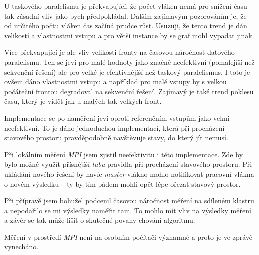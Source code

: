 \documentclass[czech]{article}
\begin{document}
U taskového paralelismu je překvapující, že počet vláken nemá pro snížení času tak zásadní vliv jako bych předpokládal.
Dalším zajímavým pozorováním je, že od určitého počtu vláken čas začíná prudce růst.
Usuzuji, že tento trend je dán velikostí a vlastnostmi vstupu a pro větší instance by se graf mohl vypadat jinak.

Více překvapující je ale vliv velikosti fronty na časovou náročnost datového paralelismu.
Ten se jeví pro malé hodnoty jako značně neefektivní (pomalejíší než sekvenční řešení) ale pro velké je efektivnějíší než taskový paralelismus.
I toto je ovšem dáno vlastnostmi vstupu a například pro malé vstupy by s velkou počáteční frontou degradoval na sekvenční řešení.
Zajímavý je také trend poklesu času, který je vidět jak u malých tak velkých front.

Implementace se po naměření jeví oproti referenčním vstupům jako velmi neefektivní.
To je dáno jednoduchou implementací, která při procházení stavového prostoru pravděpodobně navštěvuje stavy, do který jít nemusí.

Při lokálním měření \textit{MPI} jsem zjistil neefektivitu i této implementace.
Zde by bylo možné využít přísnějíší \textit{tabu} pravidla při procházení stavového prostoru.
Při ukládání nového řešení by navíc \textit{master} vlákno mohlo notifikovat pracovní vlákna o novém výsledku -- ty by tím pádem mohli opět lépe ořezat stavový prostor.

Při přípravě jsem bohužel podcenil časovou náročnost měření na sdíleném klastru a nepodařilo se mi výsledky naměřit tam.
To mohlo mít vliv na výsledky měření a závěr se tak může lišit o skutečné povahy chování algoritmu.

Měření v prostředí \textit{MPI} není na osobním počítači významné a proto je ve zprávě vynecháno.
\end{document}
